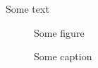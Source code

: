 \documentclass{memoir}
\begin{document}
Some text
\begin{figure}
\caption{Some caption}
Some figure
\end{figure}
\end{document}
